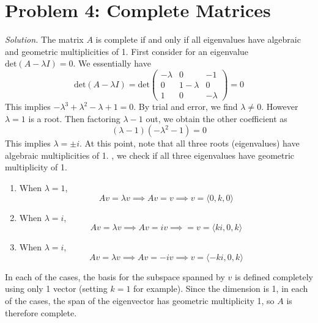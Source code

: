 \documentclass{article}
\begin{document}
\section*{Problem 4: Complete Matrices}
\emph{Solution. }The matrix $A$ is complete if and only if all eigenvalues have algebraic and geometric multiplicities of 1. First consider for an eigenvalue $\text{det}(A - \lambda I) = 0$. We essentially have
\begin{equation*}
    \text{det}(A - \lambda I) = \text{det}\begin{pmatrix}
        -\lambda & 0 & -1 \\
        0 & 1-\lambda & 0 \\
        1 & 0 & -\lambda
    \end{pmatrix} = 0
\end{equation*}
This implies $-\lambda^{3} + \lambda^{2} - \lambda + 1 = 0$. By trial and error, we find $\lambda \neq 0$. However $\lambda = 1$ is a root. Then factoring $\lambda - 1$ out, we obtain the other coefficient as
\begin{equation*}
    (\lambda - 1)(-\lambda^{2} - 1) = 0
\end{equation*}
This implies $\lambda = \pm i$. At this point, note that all three roots (eigenvalues) have algebraic multiplicities of 1.
\newpage
{}, we check if all three eigenvalues have geometric multiplicity of 1.
\begin{enumerate}
    \item When $\lambda =1$, 
    \begin{equation*}
        Av = \lambda v \implies Av = v \implies v = \langle 0, k , 0\rangle
    \end{equation*}
    \item When $\lambda = i$, 
    \begin{equation*}
        Av = \lambda v \implies Av= iv\implies = v = \langle ki, 0, k\rangle
    \end{equation*}
    \item When $\lambda = i$, 
    \begin{equation*}
        Av = \lambda v \implies Av = -iv \implies v = \langle -ki, 0, k\rangle
    \end{equation*}
\end{enumerate}
In each of the cases, the basis for the subspace spanned by $v$ is defined completely using only 1 vector (setting $k = 1$ for example). Since the dimension is 1, in each of the cases, the span of the eigenvector has geometric multiplicity 1, so $A$ is therefore complete.
\end{document}
